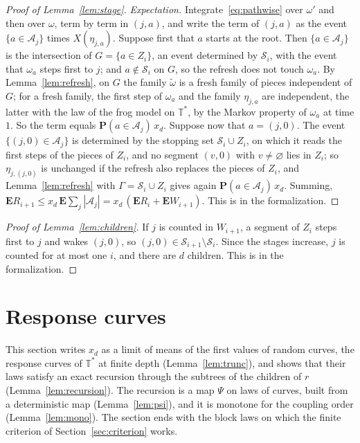 \documentclass[11pt]{amsart}
\theoremstyle{definition}
\numberwithin{equation}{section}
\newcommand{\Ts}{\mathbb{T}^{*}}
\newcommand{\E}{\mathbf{E}}
\renewcommand{\P}{\mathbf{P}}
\newcommand{\cS}{\mathcal{S}}
\newcommand{\cA}{\mathcal{A}}
\begin{document}
\begin{proof}[Proof of Lemma~\ref{lem:stage}]
\emph{Expectation.} Integrate~\eqref{eq:pathwise} over $\omega'$ and then over $\omega$, term by term in $(j,a)$, and write the term of $(j,a)$ as the event $\{a\in\cA_j\}$ times $X(\eta_{j,a})$. Suppose first that $a$ starts at the root. Then $\{a\in\cA_j\}$ is the intersection of $G=\{a\in Z_i\}$, an event determined by $\cS_i$, with the event that $\omega_a$ steps first to $j$; and $a\notin\cS_i$ on $G$, so the refresh does not touch $\omega_a$. By Lemma~\ref{lem:refresh}, on $G$ the family $\tilde\omega$ is a fresh family of pieces independent of $G$; for a fresh family, the first step of $\omega_a$ and the family $\eta_{j,a}$ are independent, the latter with the law of the frog model on $\Ts$, by the Markov property of $\omega_a$ at time $1$. So the term equals $\P(a\in\cA_j)\,x_d$. Suppose now that $a=(j,0)$. The event $\{(j,0)\in\cA_j\}$ is determined by the stopping set $\cS_i\cup Z_i$, on which it reads the first steps of the pieces of $Z_i$, and no segment $(v,0)$ with $v\ne\varnothing$ lies in $Z_i$; so $\eta_{j,(j,0)}$ is unchanged if the refresh also replaces the pieces of $Z_i$, and Lemma~\ref{lem:refresh} with $\Gamma=\cS_i\cup Z_i$ gives again $\P(a\in\cA_j)\,x_d$. Summing, $\E R_{i+1}\le x_d\,\E\sum_j|\cA_j|=x_d\,(\E R_i+\E W_{i+1})$. This is  in the formalization.
\end{proof}

\begin{proof}[Proof of Lemma~\ref{lem:children}]
If $j$ is counted in $W_{i+1}$, a segment of $Z_i$ steps first to $j$ and wakes $(j,0)$, so $(j,0)\in\cS_{i+1}\setminus\cS_i$. Since the stages increase, $j$ is counted for at most one $i$, and there are $d$ children. This is  in the formalization.
\end{proof}

\section{Response curves}\label{sec:curves}

This section writes $x_d$ as a limit of means of the first values of random curves, the response curves of $\Ts$ at finite depth (Lemma~\ref{lem:trunc}), and shows that their laws satisfy an exact recursion through the subtrees of the children of $r$ (Lemma~\ref{lem:recursion}). The recursion is a map $\Psi$ on laws of curves, built from a deterministic map (Lemma~\ref{lem:psi}), and it is monotone for the coupling order (Lemma~\ref{lem:mono}). The section ends with the block laws on which the finite criterion of Section~\ref{sec:criterion} works.
\end{document}
